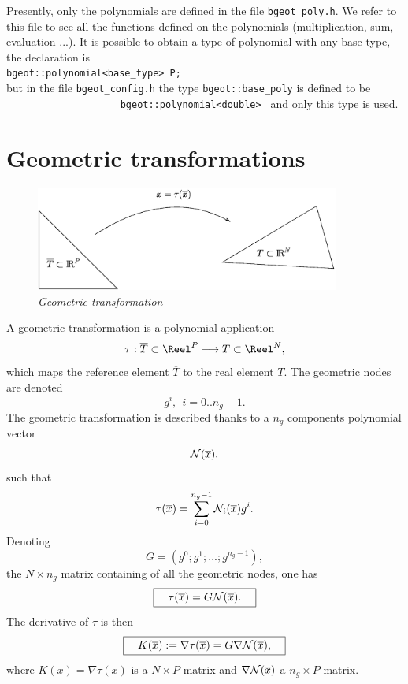 \documentclass[11pt,a4paper]{article}
\begin{document}
Presently, only the polynomials are defined in the file {\tt bgeot\_poly.h}. We refer to this file to see all the functions defined on the polynomials (multiplication, sum, evaluation ...). It is possible to obtain a type of polynomial with any base type, the declaration is\\[0.5cm]
{\tt bgeot::polynomial<base\_type> P;}\\[0.5cm]
but in the file  {\tt bgeot\_config.h} the type  {\tt bgeot::base\_poly} is defined to be $\hspace{10em}$ {\tt bgeot::polynomial<double> } and only this type is used.

\section{Geometric transformations}

\begin{figure}[htb]
  \begin{center}
    \includegraphics[width=10cm,angle=0]{getfemelem_trans.eps}
  \end{center}
  \caption{ \it Geometric transformation }
  \label{fig:transgeo}
\end{figure}

A geometric transformation is a polynomial application
$$ \tau : \overline{T} \subset \Reel^P \longrightarrow T \subset\Reel^N, $$
which maps the reference element $\overline{T}$ to the real element $T$.
The geometric nodes are denoted
$$ g^i, \ \ i = 0 .. n_g - 1. $$
The geometric transformation is described thanks to a $n_g$ components polynomial vector
$$ {\cal N}(\overline{x}), $$
such that
$$ \tau(\overline{x}) = \sum_{i = 0}^{n_g - 1} {\cal N}_i(\overline{x}) g^i.$$
Denoting
$$ G = (g^0; g^1; ...; g^{n_g - 1}), $$
the $N \times n_g$ matrix containing of all the geometric nodes, one has
$$ \fbox{$\hspace{1em}\tau(\overline{x}) = G {\cal N}(\overline{x}).\hspace{1em}$} $$
The derivative of $\tau$ is then
$$ \fbox{$\hspace{1em} K(\overline{x}) := \nabla \tau(\overline{x}) = G \nabla {\cal N}(\overline{x}),\hspace{1em}$} $$
where $K(\overline{x}) = \nabla \tau(\overline{x})$ is a $N \times P$ matrix and $\nabla {\cal N}(\overline{x})$ a $n_g \times P$ matrix.
\end{document}
